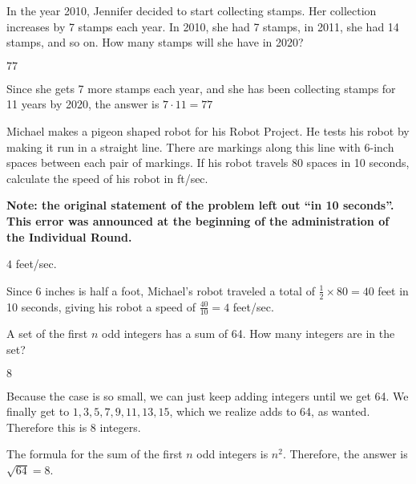 \documentclass[11pt]{article}
\begin{document}
\begin{problem} %
In the year 2010, Jennifer decided to start collecting stamps. Her collection increases by 7 stamps each year. In 2010, she had 7 stamps, in 2011, she had 14 stamps, and so on. How many stamps will she have in 2020?
\end{problem}
\begin{answer}
$\boxed{77}$
\end{answer}
\begin{solution}
Since she gets 7 more stamps each year, and she has been collecting stamps for 11 years by 2020, the answer is $7 \cdot 11 = \boxed{77}$
\end{solution}

\begin{problem} %
Michael makes a pigeon shaped robot for his Robot Project. He tests his robot by making it run in a straight line. There are markings along this line with 6-inch spaces between each pair of markings. If his robot travels 80 spaces in 10 seconds, calculate the speed of his robot in ft/sec.

\textbf{Note: the original statement of the problem left out ``in 10 seconds''. This error was announced at the beginning of the administration of the Individual Round.}
\end{problem}
\begin{answer}
$\boxed{4}$ feet/sec.
\end{answer}
\begin{solution} Since 6 inches is half a foot, Michael's robot traveled a total of $\frac{1}{2} \times 80 = 40$ feet in 10 seconds, giving his robot a speed of $\frac{40}{10} = \boxed{4}$ feet/sec.
\end{solution}

\begin{problem} %
A set of the first $n$ odd integers has a sum of 64. How many integers are in the set?
\end{problem}
\begin{answer}
$\boxed{8}$
\end{answer}
\begin{solutionone}
Because the case is so small, we can just keep adding integers until we get 64. We finally get to $1,3,5,7,9,11,13,15$, which we realize adds to 64, as wanted. Therefore this is $\boxed{8}$ integers.
\end{solutionone}
\begin{solutiontwo}
The formula for the sum of the first $n$ odd integers is $n^2$. Therefore, the answer is $\sqrt{64} = \boxed{8}$.
\end{solutiontwo}
\end{document}
